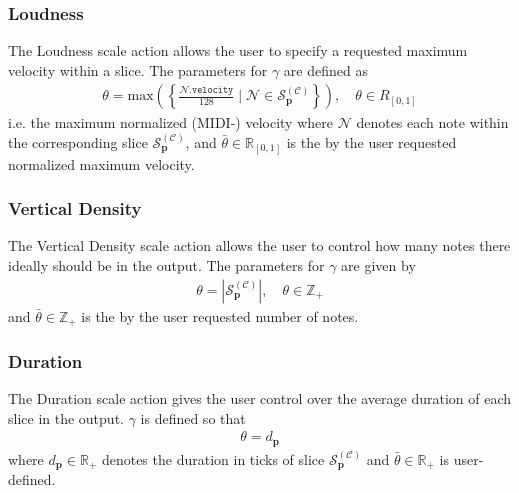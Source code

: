 	
\subsubsection{Loudness}
The Loudness scale action allows the user to specify a requested maximum velocity within a slice. The parameters for $\gamma$ are defined as
	\begin{align}
		\theta = \text{max}\left( \left\lbrace \frac{\mathcal N\texttt{.velocity}}{128} \;\vert\; \mathcal N \in \mathcal S_{\bm p}^{(\mathcal C)} \right\rbrace\right), \quad \theta \in R_{[0,1]}
	\end{align}
	i.e. the maximum normalized (MIDI-) velocity where $\mathcal N$ denotes each note within the corresponding slice $\mathcal S^{(\mathcal C)}_{\bm p}$, and $\bar{\theta} \in \mathbb R_{[0,1]}$ is the by the user requested normalized maximum velocity.
	
\subsubsection{Vertical Density} 
The Vertical Density scale action allows the user to control how many notes there ideally should be in the output. The parameters for $\gamma$ are given by
	\begin{align}
		\theta = \left\lvert \mathcal S^{(\mathcal C)}_{\bm p}\right\rvert, \quad \theta \in \mathbb Z_+	
	\end{align}
	and $\bar{\theta} \in \mathbb Z_+$ is the by the user requested number of notes.
	
\subsubsection{Duration}
The Duration scale action gives the user control over the average duration of each slice in the output. $\gamma$ is defined so that
	\begin{align}
		\theta = d_{\bm p}
	\end{align}
	where $d_{\bm p} \in \mathbb R_+$ denotes the duration in ticks of slice $\mathcal S^{(\mathcal C)}_{\bm p}$ and $\bar{\theta} \in \mathbb R_+$ is user-defined.


